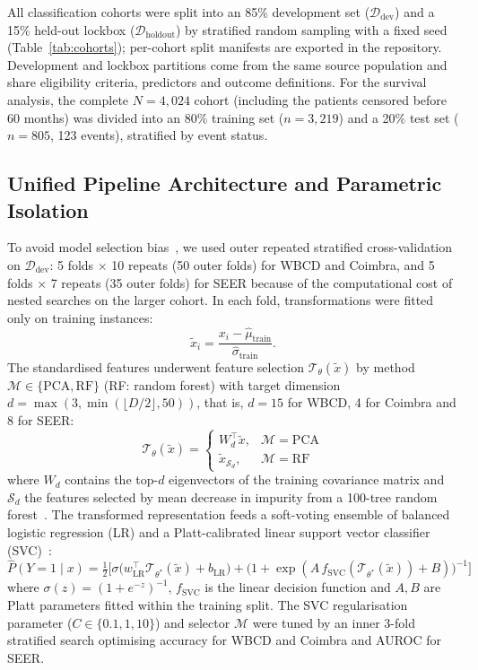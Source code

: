 \documentclass[11pt,a4paper]{article}
\begin{document}
All classification cohorts were split into an 85\% development set ($\mathcal{D}_{\text{dev}}$) and a 15\% held-out lockbox ($\mathcal{D}_{\text{holdout}}$) by stratified random sampling with a fixed seed (Table~\ref{tab:cohorts}); per-cohort split manifests are exported in the repository. Development and lockbox partitions come from the same source population and share eligibility criteria, predictors and outcome definitions. For the survival analysis, the complete $N=4{,}024$ cohort (including the patients censored before 60 months) was divided into an 80\% training set ($n=3{,}219$) and a 20\% test set ($n=805$, 123 events), stratified by event status.

\subsection{Unified Pipeline Architecture and Parametric Isolation}\label{sec:unified-pipeline-architecture-}
To avoid model selection bias~\cite{varma2006}, we used outer repeated stratified cross-validation on $\mathcal{D}_{\text{dev}}$: 5 folds $\times$ 10 repeats (50 outer folds) for WBCD and Coimbra, and 5 folds $\times$ 7 repeats (35 outer folds) for SEER because of the computational cost of nested searches on the larger cohort. In each fold, transformations were fitted only on training instances:
\begin{equation}
\tilde{x}_i = \frac{x_i-\hat{\mu}_{\text{train}}}{\hat{\sigma}_{\text{train}}}.
\end{equation}
The standardised features underwent feature selection $\mathcal{T}_\theta(\tilde{x})$ by method $\mathcal{M}\in\{\text{PCA},\text{RF}\}$ (RF: random forest) with target dimension $d=\max(3,\min(\lfloor D/2\rfloor,50))$, that is, $d=15$ for WBCD, 4 for Coimbra and 8 for SEER:
\begin{equation}
\mathcal{T}_\theta(\tilde{x})=\begin{cases} W_d^{\top}\tilde{x}, & \mathcal{M}=\text{PCA}\\ \tilde{x}_{\mathcal{S}_d}, & \mathcal{M}=\text{RF}\end{cases}
\end{equation}
where $W_d$ contains the top-$d$ eigenvectors of the training covariance matrix and $\mathcal{S}_d$ the features selected by mean decrease in impurity from a 100-tree random forest~\cite{breiman2001}. The transformed representation feeds a soft-voting ensemble of balanced logistic regression (LR) and a Platt-calibrated linear support vector classifier (SVC)~\cite{platt1999,lin2007}:
\begin{equation}
\hat{P}(Y=1\mid x)=\tfrac{1}{2}\Big[\sigma\big(w_{\text{LR}}^{\top}\mathcal{T}_{\theta^*}(\tilde{x})+b_{\text{LR}}\big)+\big(1+\exp(A\,f_{\text{SVC}}(\mathcal{T}_{\theta^*}(\tilde{x}))+B)\big)^{-1}\Big]
\end{equation}
where $\sigma(z)=(1+e^{-z})^{-1}$, $f_{\text{SVC}}$ is the linear decision function and $A,B$ are Platt parameters fitted within the training split. The SVC regularisation parameter ($C\in\{0.1,1,10\}$) and selector $\mathcal{M}$ were tuned by an inner 3-fold stratified search optimising accuracy for WBCD and Coimbra and AUROC for SEER.
\end{document}
